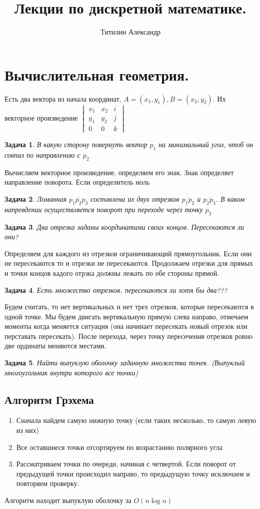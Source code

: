 \documentclass{scrartcl}
\title{Лекции по дискретной математике.}
\author{Титилин Александр}
\date{}
\newtheorem{task}{Задача}
\begin{document}
\maketitle
\section{Вычислительная геометрия.}
Есть два вектора из начала координат, $A = (x_1,y_1) , B  = (x_2, y_2)$.
Их векторное произведение $\begin{vmatrix}
		x_1 & x_2 & i \\
		y_1 & y_2 & j \\
		0   & 0   & k
	\end{vmatrix} $
\begin{task}
	В какую сторону повернуть вектор $p_1$ на минимальный угол, чтоб он совпал по направлению с $p_2$
\end{task}
Вычисляем векторное произведение, определяем его знак. Знак определяет направление поворота. Если определитель ноль
\begin{task}
	Ломанная $\overline{p_1p_2p_3}$ составлена их двух отрезков $\overline{p_1p_2}$
	и $\overline{p_2 p_3}$. В каком напревдении осуществляется поворот при переходе через точку $p_2$
\end{task}
\begin{task}
	Два отрезка заданы координатами своих концов. Пересекаются ли они?
\end{task}
Определяем для каждого из отрезков ограничивающий прямоугольник. Если они не пересекаются то и отрезки не пересекаются. Продолжаем отрезки для прямых и точки концов кадого отрзка должны лежать по обе стороны прямой.
\begin{task}
	Есть множество отрезков, пересекаются ли хотя бы два???
\end{task}
Будем считать, то нет вертикальных и нет трех отрезков, которые пересекаются в одной точке.
Мы будем двигать вертикальную прямую слева направо, отмечаем моменты когда меняется ситуация (она начинает пересекать новый отрезок или перставать пересекать). После перехода, через точку пересечения отрезков ровно две ординаты меняются местами.
\begin{task}
	Найти выпуклую оболочку заданную множества точек. (Выпуклый многоугольник внутри которого все точки)
\end{task}
\subsection{Алгоритм Грэхема}
\begin{enumerate}
	\item Сначала найдем самую нижную точку (если таких несколько, то самую левую из них)
	\item Все оставшиеся точки отсортируем по возрастанию полярного угла
	\item Рассматриваем точки по очереди, начиная с четвертой. Если поворот от предыдущей точки происходил направо, то предыдущую точку исключаем и повторяем проверку.
\end{enumerate}
Алгоритм находит выпуклую оболочку за $O(n \log{n})$
\end{document}
